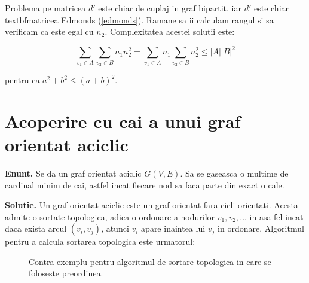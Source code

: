 Problema pe matricea $d'$ este chiar de cuplaj in graf bipartit, iar $d'$ este chiar textbf{matricea Edmonds} (\ref{edmonds}). Ramane sa ii calculam
rangul si sa verificam ca este egal cu $n_{2}$. Complexitatea acestei solutii este:

\begin{equation}
  \sum_{v_{1} \in A} \sum_{v_{2} \in B} n_{1}n_{2}^{2} = \sum_{v_{1} \in A} n_{1} \sum_{v_{2} \in B} n_{2}^{2} \leq |A||B|^{2}
\end{equation}

\noindent pentru ca $a^{2} + b^{2} \leq (a + b)^{2}$.

\pagebreak

\section{Acoperire cu cai a unui graf orientat aciclic}

\noindent \textbf{Enunt.} Se da un graf orientat aciclic $G(V, E)$. Sa se gaseasca o multime de cardinal minim de cai, astfel incat
fiecare nod sa faca parte din exact o cale.

\noindent \textbf{Solutie.} Un graf orientat aciclic este un graf orientat fara cicli orientati. Acesta admite o sortate topologica,
adica o ordonare a nodurilor $v_{1}, v_{2}, \ldots$ in asa fel incat daca exista arcul $(v_{i}, v_{j})$, atunci $v_{i}$ apare inaintea
lui $v_{j}$ in ordonare. Algoritmul pentru a calcula sortarea topologica este urmatorul:

\begin{algorithm}[H]
  \DontPrintSemicolon
  \;
\end{algorithm}

\begin{algorithm}[H]
  \DontPrintSemicolon
  \;
\end{algorithm}

\pagebreak

\begin{figure}
  \caption{Contra-exemplu pentru algoritmul de sortare topologica in care se foloseste preordinea.}
  \centering
\end{figure}

